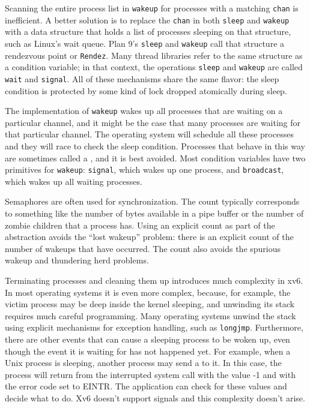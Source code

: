 Scanning the entire process list in
\lstinline{wakeup}
for processes with a matching
\lstinline{chan}
is inefficient.  A better solution is to
replace the
\lstinline{chan}
in both
\lstinline{sleep}
and
\lstinline{wakeup}
with a data structure that holds
a list of processes sleeping on that structure,
such as Linux's wait queue.
Plan 9's
\lstinline{sleep}
and
\lstinline{wakeup}
call that structure a rendezvous point or
\lstinline{Rendez}.
Many thread libraries refer to the same
structure as a condition variable;
in that context, the operations
\lstinline{sleep}
and
\lstinline{wakeup}
are called
\lstinline{wait}
and
\lstinline{signal}.
All of these mechanisms share the same
flavor: the sleep condition is protected by
some kind of lock dropped atomically during sleep.

The implementation of
\lstinline{wakeup}
wakes up all processes that are waiting on a particular channel, and it might be
the case that many processes are waiting for that particular channel.   The
operating system will schedule all these processes and they will race to check
the sleep condition.  Processes that behave in this way are sometimes called a
,
and it is best avoided.
Most condition variables have two primitives for
\lstinline{wakeup}:
\lstinline{signal},
which wakes up one process, and
\lstinline{broadcast},
which wakes up all waiting processes.

Semaphores are often used for synchronization.
The count typically corresponds to something like
the number of bytes available in a pipe buffer
or the number of zombie children that a process has.
Using an explicit count as part of the abstraction
avoids the ``lost wakeup'' problem:
there is an explicit count of the number
of wakeups that have occurred.
The count also avoids the spurious wakeup
and thundering herd problems.

Terminating processes and cleaning them up introduces much complexity in xv6.
In most operating systems it is even more complex, because, for example, the
victim process may be deep inside the kernel sleeping, and unwinding its
stack requires much careful programming.  Many operating systems unwind the stack
using explicit mechanisms for exception handling, such as
\lstinline{longjmp}.
Furthermore, there are other events that can cause a sleeping process to be
woken up, even though the event it is waiting for has not happened yet.  For
example, when a Unix process is sleeping, another process may send a 
to it.  In this case, the
process will return from the interrupted system call with the value -1 and with
the error code set to EINTR. The application can check for these values and
decide what to do.  Xv6 doesn't support signals and this complexity doesn't arise.

